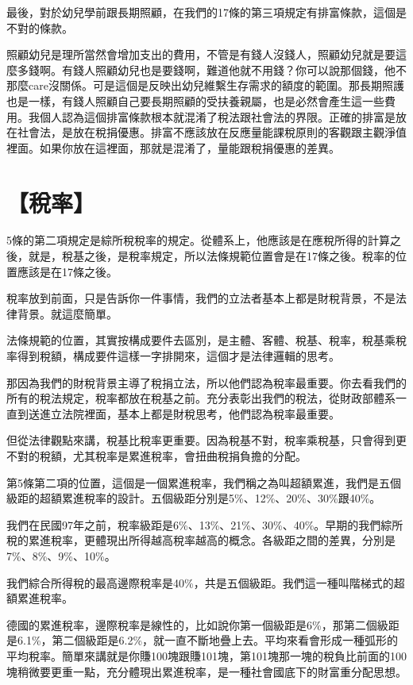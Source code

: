 \documentclass[oneside,sub3section]{ctexbook}
\begin{document}
最後，對於幼兒學前跟長期照顧，在我們的17條的第三項規定有排富條款，這個是不對的條款。

照顧幼兒是理所當然會增加支出的費用，不管是有錢人沒錢人，照顧幼兒就是要這麼多錢啊。有錢人照顧幼兒也是要錢啊，難道他就不用錢？你可以說那個錢，他不那麼care沒關係。可是這個是反映出幼兒維繫生存需求的額度的範圍。那長期照護也是一樣，有錢人照顧自己要長期照顧的受扶養親屬，也是必然會產生這一些費用。我個人認為這個排富條款根本就混淆了稅法跟社會法的界限。正確的排富是放在社會法，是放在稅捐優惠。排富不應該放在反應量能課稅原則的客觀跟主觀淨值裡面。如果你放在這裡面，那就是混淆了，量能跟稅捐優惠的差異。

\hypertarget{ux7a05ux7387-1}{%
\section{【稅率】}\label{ux7a05ux7387-1}}

5條的第二項規定是綜所稅稅率的規定。從體系上，他應該是在應稅所得的計算之後，就是，稅基之後，是稅率規定，所以法條規範位置會是在17條之後。稅率的位置應該是在17條之後。

稅率放到前面，只是告訴你一件事情，我們的立法者基本上都是財稅背景，不是法律背景。就這麼簡單。

法條規範的位置，其實按構成要件去區別，是主體、客體、稅基、稅率，稅基乘稅率得到稅額，構成要件這樣一字排開來，這個才是法律邏輯的思考。

那因為我們的財稅背景主導了稅捐立法，所以他們認為稅率最重要。你去看我們的所有的稅法規定，稅率都放在稅基之前。充分表彰出我們的稅法，從財政部體系一直到送進立法院裡面，基本上都是財稅思考，他們認為稅率最重要。

但從法律觀點來講，稅基比稅率更重要。因為稅基不對，稅率乘稅基，只會得到更不對的稅額，尤其稅率是累進稅率，會扭曲稅捐負擔的分配。

第5條第二項的位置，這個是一個累進稅率，我們稱之為叫超額累進，我們是五個級距的超額累進稅率的設計。五個級距分別是5\%、12\%、20\%、30\%跟40\%。

我們在民國97年之前，稅率級距是6\%、13\%、21\%、30\%、40\%。早期的我們綜所稅的累進稅率，更體現出所得越高稅率越高的概念。各級距之間的差異，分別是7\%、8\%、9\%、10\%。

我們綜合所得稅的最高邊際稅率是40\%，共是五個級距。我們這一種叫階梯式的超額累進稅率。

德國的累進稅率，邊際稅率是線性的，比如說你第一個級距是6\%，那第二個級距是6.1\%，第二個級距是6.2\%，就一直不斷地疊上去。平均來看會形成一種弧形的平均稅率。簡單來講就是你賺100塊跟賺101塊，第101塊那一塊的稅負比前面的100塊稍微要更重一點，充分體現出累進稅率，是一種社會國底下的財富重分配思想。
\end{document}
